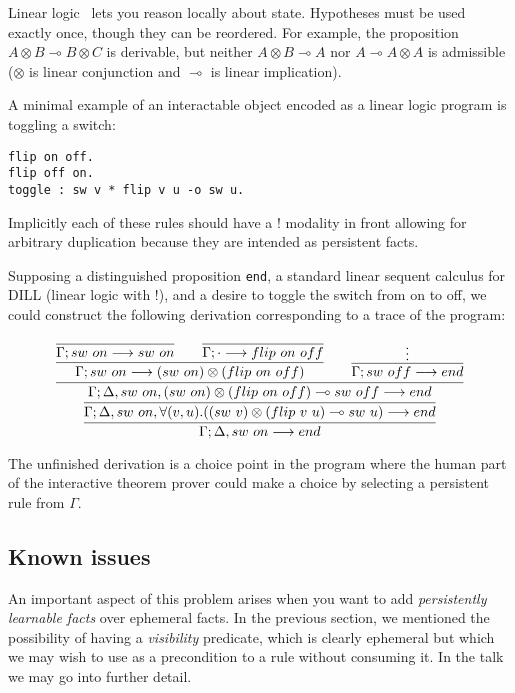 \newcommand{\lolli}{\multimap}

Linear logic~\cite{Girard87} lets you reason locally about state. Hypotheses must be used
exactly once, though they can be reordered. For example, the proposition $A
\otimes B \lolli B \otimes C$ is derivable, but neither $A \otimes B \lolli
A$ nor $A \lolli A \otimes A$ is admissible ($\otimes$ is linear
conjunction and $\lolli$ is linear implication).

A minimal example of an interactable object encoded as a linear logic
program is toggling a switch:

\begin{verbatim}
flip on off.
flip off on.
toggle : sw v * flip v u -o sw u.
\end{verbatim}

Implicitly each of these rules should have a $!$ modality in front allowing
for arbitrary duplication because they are intended as persistent facts.

Supposing a distinguished proposition \verb|end|, a standard linear sequent
calculus for DILL (linear logic with $!$), and a desire to toggle the
switch from on to off, we could construct the following derivation
corresponding to a trace of the program:

\small{
\[
\infer
{
  \Gamma; \Delta, sw\ on \longrightarrow end
}
{
  \infer
  {
    \Gamma; \Delta, sw\ on, \forall(v,u).((sw\ v)\otimes (flip\ v\
    u)\multimap sw\ u)
    \longrightarrow end
  }
  {
  \infer
    {
    \Gamma; \Delta, sw\ on, (sw\ on)\otimes (flip\ on\ off)\multimap sw\
    off
    \longrightarrow end
    }
    {
        \infer{
          \Gamma; sw\ on \longrightarrow (sw\ on)\otimes(flip\ on\ off)
          }
          {
            \infer
            {\Gamma; sw\ on \longrightarrow sw\ on}
            {}
            \qquad
            \infer
            {\Gamma; \cdot \longrightarrow flip\ on\ off}
            {}
          }
        \qquad
        \infer{
          \Gamma; sw\ off \longrightarrow end
          }
          {\vdots
          }
    }
  }
}
\]
}

The unfinished derivation is a choice point in the program where the human
part of the interactive theorem prover could make a choice by selecting a
persistent rule from $\Gamma$. 

\subsection{Known issues}

An important aspect of this problem arises when you want to add {\em
persistently learnable facts} over ephemeral facts. In the previous
section, we mentioned the possibility of having a {\em visibility}
predicate, which is clearly ephemeral but which we may wish to use as a
precondition to a rule without consuming it. In the talk we may go into
further detail.
